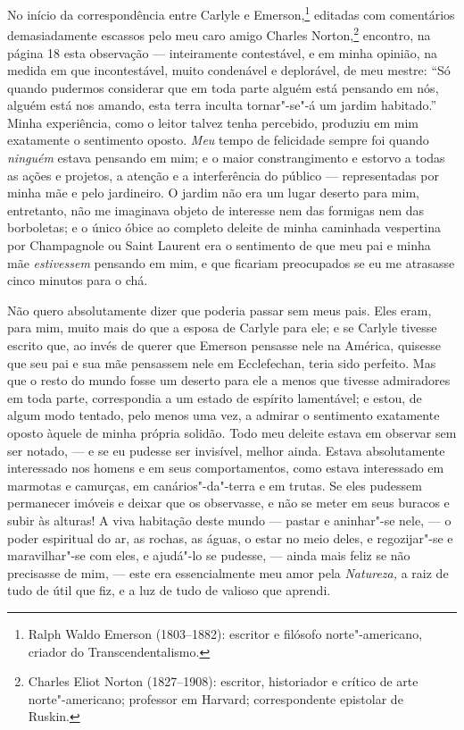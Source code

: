 No início da correspondência entre Carlyle e Emerson,\footnote{Ralph
  Waldo Emerson (1803--1882): escritor e filósofo norte"-americano,
  criador do Transcendentalismo.} editadas com
comentários demasiadamente escassos pelo meu caro amigo Charles
Norton,\footnote{Charles Eliot Norton (1827--1908): escritor, historiador
  e crítico de arte norte"-americano; professor em Harvard;
  correspondente epistolar de Ruskin.} encontro, na
página 18 esta observação --- inteiramente contestável, e em minha
opinião, na medida em que incontestável, muito condenável e deplorável,
de meu mestre: ``Só quando pudermos considerar que em toda parte alguém
está pensando em nós, alguém está nos amando, esta terra inculta
tornar"-se"-á um jardim habitado.'' Minha experiência, como o leitor
talvez tenha percebido, produziu em mim exatamente o sentimento oposto.
\textit{Meu} tempo de felicidade sempre foi quando \textit{ninguém} estava
pensando em mim; e o maior constrangimento e estorvo a todas as ações e
projetos, a atenção e a interferência do público --- representadas por
minha mãe e pelo jardineiro. O jardim não era um lugar deserto para mim,
entretanto, não me imaginava objeto de interesse nem das formigas nem
das borboletas; e o único óbice ao completo deleite de minha caminhada
vespertina por Champagnole ou Saint Laurent era o sentimento de que meu
pai e minha mãe \textit{estivessem} pensando em mim, e que ficariam
preocupados se eu me atrasasse cinco minutos para o chá.

Não quero absolutamente dizer que poderia passar sem meus pais. Eles
eram, para mim, muito mais do que a esposa de Carlyle para ele; e se
Carlyle tivesse escrito que, ao invés de querer que Emerson pensasse
nele na América, quisesse que seu pai e sua mãe pensassem nele em
Ecclefechan, teria sido perfeito. Mas que o resto do mundo fosse um
deserto para ele a menos que tivesse admiradores em toda parte,
correspondia a um estado de espírito lamentável; e estou, de algum modo
tentado, pelo menos uma vez, a admirar o sentimento exatamente oposto
àquele de minha própria solidão. Todo meu deleite estava em observar sem
ser notado, --- e se eu pudesse ser invisível, melhor ainda. Estava
absolutamente interessado nos homens e em seus comportamentos, como
estava interessado em marmotas e camurças, em canários"-da"-terra e em
trutas. Se eles pudessem permanecer imóveis e deixar que os observasse,
e não se meter em seus buracos e subir às alturas! A viva habitação
deste mundo --- pastar e aninhar"-se nele, --- o poder espiritual do ar, as
rochas, as águas, o estar no meio deles, e regozijar"-se e maravilhar"-se
com eles, e ajudá"-lo se pudesse, --- ainda mais feliz se não precisasse
de mim, --- este era essencialmente meu amor pela \textit{Natureza,} a raiz
de tudo de útil que fiz, e a luz de tudo de valioso que aprendi.

